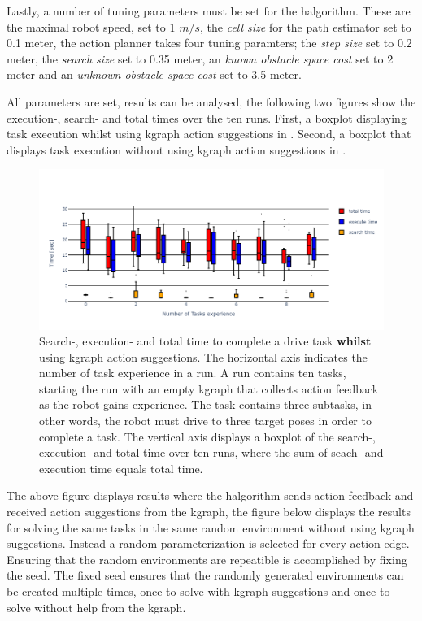 Lastly, a number of tuning parameters must be set for the \ac{halgorithm}. These are the maximal robot speed, set to 1 $m/s$, the \textit{cell size} for the path estimator set to 0.1 meter, the action planner takes four tuning paramters; the \textit{step size} set to 0.2 meter, the \textit{search size} set to 0.35 meter, an \textit{known obstacle space cost} set to 2 meter and an \textit{unknown obstacle space cost} set to 3.5 meter.\bs

All parameters are set, results can be analysed, the following two figures show the execution-, search- and total times over the ten runs. First, a boxplot displaying task execution whilst using \ac{kgraph} action suggestions in . Second, a boxplot that displays task execution without using \ac{kgraph} action suggestions in .\bs

\begin{figure}[H]
    \centering
    \includegraphics[width=\textwidth]{figures/results/random_drive_time_kgraph}
    \caption{Search-, execution- and total time to complete a drive task \textbf{whilst} using \ac{kgraph} action suggestions. The horizontal axis indicates the number of task experience in a run. A run contains ten tasks, starting the run with an empty \ac{kgraph} that collects action feedback as the robot gains experience. The task contains three subtasks, in other words, the robot must drive to three target poses in order to complete a task. The vertical axis displays a boxplot of the search-, execution- and total time over ten runs, where the sum of seach- and execution time equals total time.}%
   \label{fig:random_drive_time_kgraph}
\end{figure}

The above figure displays results where the \ac{halgorithm} sends action feedback and received action suggestions from the \ac{kgraph}, the figure below displays the results for solving the same tasks in the same random environment without using \ac{kgraph} suggestions. Instead a random parameterization is selected for every action edge. Ensuring that the random environments are repeatible is accomplished by fixing the seed. The fixed seed ensures that the randomly generated environments can be created multiple times, once to solve with \ac{kgraph} suggestions and once to solve without help from the \ac{kgraph}.\bs


